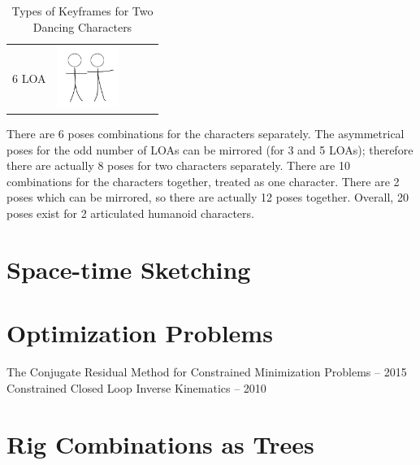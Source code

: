 \begin{table}[!htb]
\begin{tabular}{ | c | c || c | c | c | }
\begin{minipage}{.15\textwidth}
    \end{minipage} & & 
    \\ \hline
    6 LOA 
    &
    \begin{minipage}{.15\textwidth}
      \includegraphics[width=\linewidth, height=20mm]{img/6loa_separate_keyframe}
    \end{minipage}
    & & & 
    \\ \hline
  \end{tabular}
  \caption{Types of Keyframes for Two Dancing Characters}
  \label{table:LOAChart}
\end{table}

There are 6 poses combinations for the characters separately. The asymmetrical poses for the odd number of LOAs can be mirrored (for 3 and 5 LOAs); therefore there are actually 8 poses for two characters separately. There are 10 combinations for the characters together, treated as one character. There are 2 poses which can be mirrored, so there are actually 12 poses together. Overall, 20 poses exist for 2 articulated humanoid characters.

\section{Space-time Sketching}


\section{Optimization Problems}
The Conjugate Residual Method for Constrained Minimization Problems -- 2015\\
Constrained Closed Loop Inverse Kinematics -- 2010

\section{Rig Combinations as Trees}
